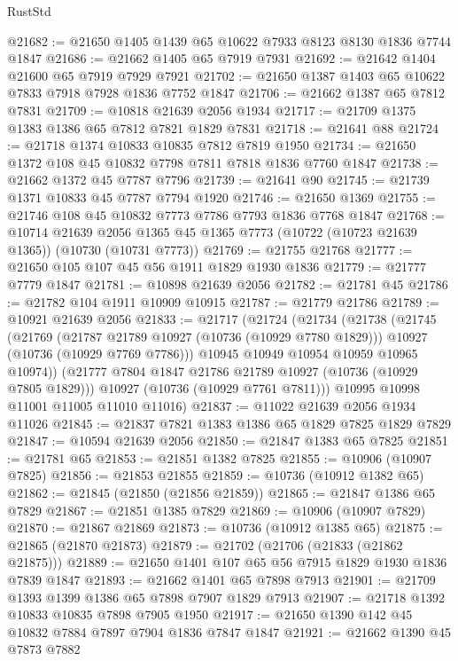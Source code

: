 \begin{lexlean}{RustStd}
\begin{coremodule}
@21682 := @21650 @1405 @1439 @65 @10622 @7933 @8123 @8130 @1836 @7744 @1847
@21686 := @21662 @1405 @65 @7919 @7931
@21692 := @21642 @1404 @21600 @65 @7919 @7929 @7921
@21702 := @21650 @1387 @1403 @65 @10622 @7833 @7918 @7928 @1836 @7752 @1847
@21706 := @21662 @1387 @65 @7812 @7831
@21709 := @10818 @21639 @2056 @1934
@21717 := @21709 @1375 @1383 @1386 @65 @7812 @7821 @1829 @7831
@21718 := @21641 @88
@21724 := @21718 @1374 @10833 @10835 @7812 @7819 @1950
@21734 := @21650 @1372 @108 @45 @10832 @7798 @7811 @7818 @1836 @7760 @1847
@21738 := @21662 @1372 @45 @7787 @7796
@21739 := @21641 @90
@21745 := @21739 @1371 @10833 @45 @7787 @7794 @1920
@21746 := @21650 @1369
@21755 := @21746 @108 @45 @10832 @7773 @7786 @7793 @1836 @7768 @1847
@21768 := @10714
    @21639
    @2056
    @1365
    @45
    @1365
    @7773
    (@10722 (@10723 @21639 @1365))
    (@10730 (@10731 @7773))
@21769 := @21755 @21768
@21777 := @21650 @105 @107 @45 @56 @1911 @1829 @1930 @1836
@21779 := @21777 @7779 @1847
@21781 := @10898 @21639 @2056
@21782 := @21781 @45
@21786 := @21782 @104 @1911 @10909 @10915
@21787 := @21779 @21786
@21789 := @10921 @21639 @2056
@21833 := @21717
    (@21724
      (@21734
        (@21738
          (@21745
            (@21769
              (@21787 @21789 @10927 (@10736 (@10929 @7780 @1829)))
              @10927
              (@10736 (@10929 @7769 @7786)))
            @10945
            @10949
            @10954
            @10959
            @10965
            @10974))
        (@21777 @7804 @1847 @21786 @21789 @10927 (@10736 (@10929 @7805 @1829)))
        @10927
        (@10736 (@10929 @7761 @7811)))
      @10995
      @10998
      @11001
      @11005
      @11010
      @11016)
@21837 := @11022 @21639 @2056 @1934 @11026
@21845 := @21837 @7821 @1383 @1386 @65 @1829 @7825 @1829 @7829
@21847 := @10594 @21639 @2056
@21850 := @21847 @1383 @65 @7825
@21851 := @21781 @65
@21853 := @21851 @1382 @7825
@21855 := @10906 (@10907 @7825)
@21856 := @21853 @21855
@21859 := @10736 (@10912 @1382 @65)
@21862 := @21845 (@21850 (@21856 @21859))
@21865 := @21847 @1386 @65 @7829
@21867 := @21851 @1385 @7829
@21869 := @10906 (@10907 @7829)
@21870 := @21867 @21869
@21873 := @10736 (@10912 @1385 @65)
@21875 := @21865 (@21870 @21873)
@21879 := @21702 (@21706 (@21833 (@21862 @21875)))
@21889 := @21650 @1401 @107 @65 @56 @7915 @1829 @1930 @1836 @7839 @1847
@21893 := @21662 @1401 @65 @7898 @7913
@21901 := @21709 @1393 @1399 @1386 @65 @7898 @7907 @1829 @7913
@21907 := @21718 @1392 @10833 @10835 @7898 @7905 @1950
@21917 := @21650 @1390 @142 @45 @10832 @7884 @7897 @7904 @1836 @7847 @1847
@21921 := @21662 @1390 @45 @7873 @7882

\end{coremodule}
\end{lexlean}
